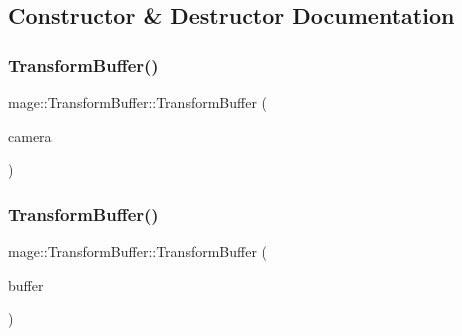\subsection{Constructor \& Destructor Documentation}
\hypertarget{structmage_1_1_transform_buffer_a9a627fb63533073b2c699136e04dae14}{}\label{structmage_1_1_transform_buffer_a9a627fb63533073b2c699136e04dae14} 
\subsubsection{\texorpdfstring{Transform\+Buffer()}{TransformBuffer()}\hspace{0.1cm}{\footnotesize\ttfamily [1/2]}}
{\footnotesize\ttfamily mage\+::\+Transform\+Buffer\+::\+Transform\+Buffer (\begin{DoxyParamCaption}\item[{const \hyperlink{classmage_1_1_camera}{Camera} \&}]{camera }\end{DoxyParamCaption})}

\hypertarget{structmage_1_1_transform_buffer_a1ede694450450cc6b13a5caed373abad}{}\label{structmage_1_1_transform_buffer_a1ede694450450cc6b13a5caed373abad} 
\subsubsection{\texorpdfstring{Transform\+Buffer()}{TransformBuffer()}\hspace{0.1cm}{\footnotesize\ttfamily [2/2]}}
{\footnotesize\ttfamily mage\+::\+Transform\+Buffer\+::\+Transform\+Buffer (\begin{DoxyParamCaption}\item[{const \hyperlink{structmage_1_1_transform_buffer}{Transform\+Buffer} \&}]{buffer }\end{DoxyParamCaption})\hspace{0.3cm}{\ttfamily [default]}}

\hypertarget{structmage_1_1_transform_buffer_aac881d64eb39634d0e0e6cd8a13b6e2a}{}\label{structmage_1_1_transform_buffer_aac881d64eb39634d0e0e6cd8a13b6e2a} 
